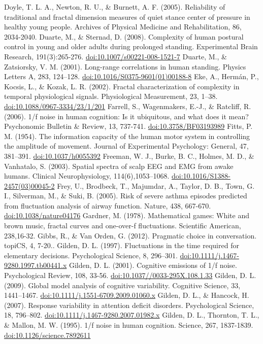 \documentclass[12pt,]{book}
\begin{document}
Doyle, T. L. A., Newton, R. U., \& Burnett, A. F. (2005). Reliability of traditional and fractal dimension measures of quiet stance center of pressure in healthy young people. Archives of Physical Medicine and Rehabilitation, 86, 2034-2040.
Duarte, M., \& Sternad, D. (2008). Complexity of human postural control in young and older adults during prolonged standing. Experimental Brain Research, 191(3):265-276. \url{doi:10.1007/s00221-008-1521-7}
Duarte, M., \& Zatsiorsky, V. M. (2001). Long-range correlations in human standing. Physics Letters A, 283, 124--128. \url{doi:10.1016/S0375-9601(01)00188-8}
Eke, A., Hermán, P., Kocsis, L., \& Kozak, L. R. (2002). Fractal characterization of complexity in temporal physiological signals. Physiological Measurement, 23, 1--38. \url{doi:10.1088/0967-3334/23/1/201}
Farrell, S., Wagenmakers, E.-J., \& Ratcliff, R. (2006). 1/f noise in human cognition: Is it ubiquitous, and what does it mean? Psychonomic Bulletin \& Review, 13, 737-741. \url{doi:10.3758/BF03193989}
Fitts, P. M. (1954). The information capacity of the human motor system in controlling the amplitude of movement. Journal of Experimental Psychology: General, 47, 381--391. \url{doi:10.1037/h0055392}
Freeman, W. J., Burke, B. C., Holmes, M. D., \& Vanhatalo, S. (2003). Spatial spectra of scalp EEG and EMG from awake humans. Clinical Neurophysiology, 114(6),1053--1068. \url{doi:10.1016/S1388-2457(03)00045-2}
Frey, U., Brodbeck, T., Majumdar, A., Taylor, D. B., Town, G. I., Silverman, M., \& Suki, B. (2005). Risk of severe asthma episodes predicted from fluctuation analysis of airway function. Nature, 438, 667-670. \url{doi:10.1038/nature04176}
Gardner, M. (1978). Mathematical games: White and brown music, fractal curves and one-over-f fluctuations. Scientific American, 238,16-32.
Gibbs, R., \& Van Orden, G. (2012). Pragmatic choice in conversation. topiCS, 4, 7-20..
Gilden, D. L. (1997). Fluctuations in the time required for elementary decisions. Psychological Science, 8, 296--301. \url{doi:10.1111/j.1467-9280.1997.tb00441.x}
Gilden, D. L. (2001). Cognitive emissions of 1/f noise. Psychological Review, 108, 33-56. \url{doi:10.1037//0033-295X.108.1.33}
Gilden, D. L. (2009). Global model analysis of cognitive variability. Cognitive Science, 33, 1441--1467. \url{doi:10.1111/j.1551-6709.2009.01060.x}
Gilden, D. L., \& Hancock, H. (2007). Response variability in attention deficit disorders. Psychological Science, 18, 796--802. \url{doi:10.1111/j.1467-9280.2007.01982.x}
Gilden, D. L., Thornton, T. L., \& Mallon, M. W. (1995). 1/f noise in human cognition. Science, 267, 1837-1839. \url{doi:10.1126/science.7892611}
\end{document}

